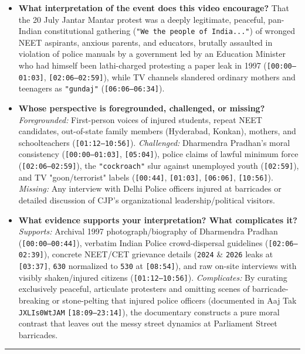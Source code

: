 \documentclass[10pt,a4paper]{article}
\begin{document}
\begin{itemize}[leftmargin=1.5em, itemsep=3pt, topsep=4pt]
  \item \textbf{What interpretation of the event does this video encourage?} That the 20 July Jantar Mantar protest was a deeply legitimate, peaceful, pan-Indian constitutional gathering (\texttt{"We the people of India..."}) of wronged NEET aspirants, anxious parents, and educators, brutally assaulted in violation of police manuals by a government led by an Education Minister who had himself been lathi-charged protesting a paper leak in 1997 (\texttt{[00:00--01:03]}, \texttt{[02:06--02:59]}), while TV channels slandered ordinary mothers and teenagers as \texttt{"gundaj"} (\texttt{[06:06--06:34]}).
  \item \textbf{Whose perspective is foregrounded, challenged, or missing?} \textit{Foregrounded:} First-person voices of injured students, repeat NEET candidates, out-of-state family members (Hyderabad, Konkan), mothers, and schoolteachers (\texttt{[01:12--10:56]}). \textit{Challenged:} Dharmendra Pradhan's moral consistency (\texttt{[00:00--01:03]}, \texttt{[05:04]}), police claims of lawful minimum force (\texttt{[02:06--02:59]}), the \texttt{"cockroach"} slur against unemployed youth (\texttt{[02:59]}), and TV "goon/terrorist" labels (\texttt{[00:44]}, \texttt{[01:03]}, \texttt{[06:06]}, \texttt{[10:56]}). \textit{Missing:} Any interview with Delhi Police officers injured at barricades or detailed discussion of CJP's organizational leadership/political visitors.
  \item \textbf{What evidence supports your interpretation? What complicates it?} \textit{Supports:} Archival 1997 photograph/biography of Dharmendra Pradhan (\texttt{[00:00--00:44]}), verbatim Indian Police crowd-dispersal guidelines (\texttt{[02:06--02:39]}), concrete NEET/CET grievance details (\texttt{2024} \& \texttt{2026} leaks at \texttt{[03:37]}, \texttt{630} normalized to \texttt{530} at \texttt{[08:54]}), and raw on-site interviews with visibly shaken/injured citizens (\texttt{[01:12--10:56]}). \textit{Complicates:} By curating exclusively peaceful, articulate protesters and omitting scenes of barricade-breaking or stone-pelting that injured police officers (documented in Aaj Tak \texttt{JXLIs0WtJAM} \texttt{[18:09--23:14]}), the documentary constructs a pure moral contrast that leaves out the messy street dynamics at Parliament Street barricades.
\end{itemize}
\vspace{4pt}\noindent\rule{\textwidth}{0.4pt}\vspace{4pt}
\end{document}
